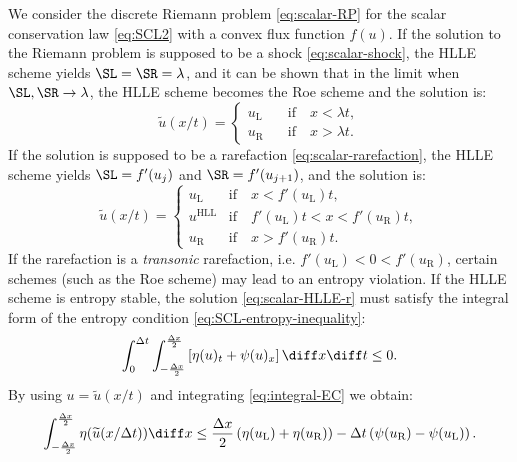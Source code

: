 We consider the discrete Riemann problem \eqref{eq:scalar-RP} for the scalar conservation law \eqref{eq:SCL2} with a convex flux function $ f(u) $. If the solution to the Riemann problem is supposed to be a shock \eqref{eq:scalar-shock}, the HLLE scheme yields $ \SL = \SR = \lambda $, and it can be shown that in the limit when $ \SL, \SR \rightarrow \lambda $, the HLLE scheme becomes the Roe scheme and the solution is:
\begin{equation} 
\widetilde{u}(x/t) = \left\{ \begin{array}{lll}
	u_\text{L} \quad & \text{if} \quad x < \lambda t, \\[0.25em]
	u_\text{R}		 & \text{if} \quad x > \lambda t. \end{array} \right.
\end{equation}
If the solution is supposed to be a rarefaction \eqref{eq:scalar-rarefaction}, the HLLE scheme yields $ \SL = f'(u_j) $ and $ \SR = f'(u_{j+1}) $, and the solution is:
\begin{equation} \label{eq:scalar-HLLE-r}
\widetilde{u}(x/t) = \left\{ \begin{array}{lll}
	u_\text{L}\quad & \text{if} \quad x < f'(u_\text{L}) t, \\[0.25em]
	u^\text{HLL}	& \text{if} \quad f'(u_\text{L}) t < x < f'(u_\text{R}) t, \\[0.25em]
	u_\text{R}      & \text{if} \quad x > f'(u_\text{R}) t. \end{array} \right.
\end{equation}
If the rarefaction is a \textit{transonic} rarefaction, i.e. \mbox{$ f'(u_\text{L}) < 0 <f'(u_\text{R}) $}, certain schemes (such as the Roe scheme) may lead to an entropy violation. If the HLLE scheme is entropy stable, the solution \eqref{eq:scalar-HLLE-r} must satisfy the integral form of the entropy condition \eqref{eq:SCL-entropy-inequality}:
\begin{equation} \label{eq:integral-EC}
\int_{0}^{\Delta t} \int_{-\frac{\Delta x}{2}}^{\frac{\Delta x}{2}} \left[ \eta (u)_t + \psi(u)_x \right] \diff x \diff t \leq 0.
\end{equation}
By using $ u = \widetilde{u}(x/t) $ and integrating \eqref{eq:integral-EC} we obtain:
\begin{equation}
\int_{-\frac{\Delta x}{2}}^{\frac{\Delta x}{2}} \eta (\widetilde{u}(x/\Delta t)) \diff x \leq 
\frac{\Delta x}{2} \left( \eta (u_\text{L}) + \eta (u_\text{R}) \right) - 
\Delta t \left( \psi(u_\text{R}) - \psi (u_\text{L}) \right).
\end{equation}
